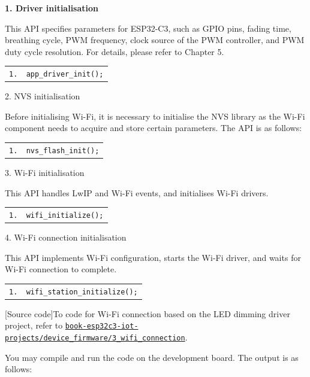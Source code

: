 \documentclass[a4paper,12pt,openany]{book}
\renewcommand{\ttfamily}{\fontfamily{pcr}\selectfont}
\renewcommand{\arraystretch}{1}
\newenvironment{codebloc}{ %
    \ttfamily\footnotesize
    \renewcommand{\arraystretch}{1}
}
\newcommand{\note}[2][NOTE]{ %
\vspace{6pt}
\begin{tabular}{b{\textwidth}}
\hline
\fontfamily{phv}\selectfont \textbf{#1}\\
\leftskip 1em #2\\
\hline
\end{tabular}
}
\begin{document}
\textbf{1. Driver initialisation}

This API specifies parameters for ESP32-C3, such as GPIO pins, fading time, breathing cycle, PWM frequency, clock source of the PWM controller, and PWM duty cycle resolution. For details, please refer to Chapter 5.

\begin{codebloc}
\begin{tabular}{d}
\verb|1.  app_driver_init();|
\end{tabular}
\end{codebloc}

\textbf{2. NVS initialisation}

Before initialising Wi-Fi, it is necessary to initialise the NVS library as the Wi-Fi component needs to acquire and store certain parameters. The API is as follows:

\begin{codebloc}
\begin{tabular}{d}
\verb|1.  nvs_flash_init();|
\end{tabular}
\end{codebloc}

\textbf{3. Wi-Fi initialisation}

This API handles LwIP and Wi-Fi events, and initialises Wi-Fi drivers.

\begin{codebloc}
\begin{tabular}{d}
\verb|1.  wifi_initialize();|
\end{tabular}
\end{codebloc}

\textbf{4. Wi-Fi connection initialisation}

This API implements Wi-Fi configuration, starts the Wi-Fi driver, and waits for Wi-Fi connection to complete.

\begin{codebloc}
\begin{tabular}{d}
\verb|1.  wifi_station_initialize();|
\end{tabular}
\end{codebloc}

\note[Source code]{To code for Wi-Fi connection based on the LED dimming driver project, refer to \href{https://github.com/espressif/book-esp32c3-iot-projects/tree/main/device_firmware/3_wifi_connection}{\texttt{book-esp32c3-iot-projects/device\_firmware/3\_wifi\_connection}}.}

You may compile and run the code on the development board. The output is as follows:
\end{document}
